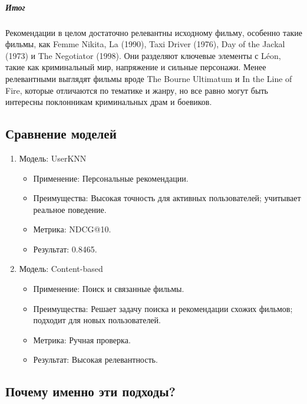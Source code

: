 \hypertarget{ux438ux442ux43eux433-2}{%
\subparagraph{Итог}\label{ux438ux442ux43eux433-2}}

\leavevmode

Рекомендации в целом достаточно релевантны исходному фильму, особенно
такие фильмы, как Femme Nikita, La (1990), Taxi Driver
(1976), Day of the Jackal (1973) и The Negotiator (1998).
Они разделяют ключевые элементы с Léon, такие как криминальный
мир, напряжение и сильные персонажи. Менее релевантными выглядят фильмы
вроде The Bourne Ultimatum и In the Line of Fire, которые
отличаются по тематике и жанру, но все равно могут быть интересны
поклонникам криминальных драм и боевиков.

\hypertarget{ux441ux440ux430ux432ux43dux435ux43dux438ux435-ux43cux43eux434ux435ux43bux435ux439}{%
\subsection*{Сравнение
моделей}\label{ux441ux440ux430ux432ux43dux435ux43dux438ux435-ux43cux43eux434ux435ux43bux435ux439}}


\begin{enumerate}
    \item Модель: UserKNN  
    \begin{itemize}
        \item Применение: Персональные рекомендации.
        \item Преимущества: Высокая точность для активных пользователей; учитывает реальное поведение.
        \item Метрика: NDCG@10.
        \item Результат: 0.8465.
    \end{itemize}
    \item Модель: Content-based  
    \begin{itemize}
        \item Применение: Поиск и связанные фильмы.
        \item Преимущества: Решает задачу поиска и рекомендации схожих фильмов; подходит для новых пользователей.
        \item Метрика: Ручная проверка.
        \item Результат: Высокая релевантность.
    \end{itemize}
\end{enumerate}



\hypertarget{ux43fux43eux447ux435ux43cux443-ux438ux43cux435ux43dux43dux43e-ux44dux442ux438-ux43fux43eux434ux445ux43eux434ux44b}{%
\subsection*{Почему именно эти
подходы?}\label{ux43fux43eux447ux435ux43cux443-ux438ux43cux435ux43dux43dux43e-ux44dux442ux438-ux43fux43eux434ux445ux43eux434ux44b}}

